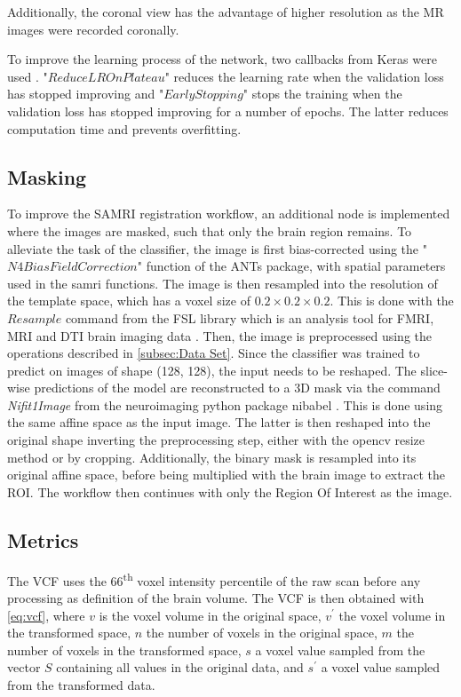 Additionally, the coronal view has the advantage of higher resolution as the MR images were recorded coronally.

To improve the learning process of the network, two callbacks from Keras were used \cite{noauthor_callbacks_nodate}.
"\textcolor{mg}{\texttt{$ReduceLROnPlateau$}}" reduces the learning rate when the validation loss has stopped improving and "\textcolor{mg}{\texttt{$EarlyStopping$}}" stops the training when the validation loss has stopped improving for a number of epochs.
The latter reduces computation time and prevents overfitting.

\subsection{Masking}
To improve the SAMRI registration workflow, an additional node is implemented where the images are masked, such that only the brain region remains.
To alleviate the task of the classifier, the image is first bias-corrected using the "\textcolor{mg}{\texttt{$N4BiasFieldCorrection$}}" function of the ANTs package, with spatial parameters used in the samri functions.
The image is then resampled into the resolution of the template space, which has a voxel size of $0.2\times 0.2 \times 0.2$.
This is done with the \textcolor{mg}{\texttt{$Resample$}} command from the FSL library which is an analysis tool for FMRI, MRI and DTI brain imaging data \cite{fsl}.
Then, the image is preprocessed using the operations described in \cref{subsec:Data Set}.
Since the classifier was trained to predict on images of shape (128, 128), the input needs to be reshaped.
The slice-wise predictions of the model are reconstructed to a 3D mask via the command \textit{Nifit1Image} from the neuroimaging python package nibabel \cite{noauthor_neuroimaging_nodate}.
This is done using the same affine space as the input image.
The latter is then reshaped into the original shape inverting the preprocessing step, either with the opencv resize method or by cropping.
Additionally, the binary mask is resampled into its original affine space, before being multiplied with the brain image to extract the ROI.
The workflow then continues with only the Region Of Interest as the image.

\subsection{Metrics}

The VCF uses the 66\textsuperscript{th} voxel intensity percentile of the raw scan before any processing as definition of the brain volume.
The VCF is then obtained with \cref{eq:vcf}, where $v$ is the voxel volume in the original space, $v^\prime$ the voxel volume in the transformed space, $n$ the number of voxels in the original space, $m$ the number of voxels in the transformed space, $s$ a voxel value sampled from the vector $S$ containing all values in the original data, and $s^\prime$ a voxel value sampled from the transformed data.

